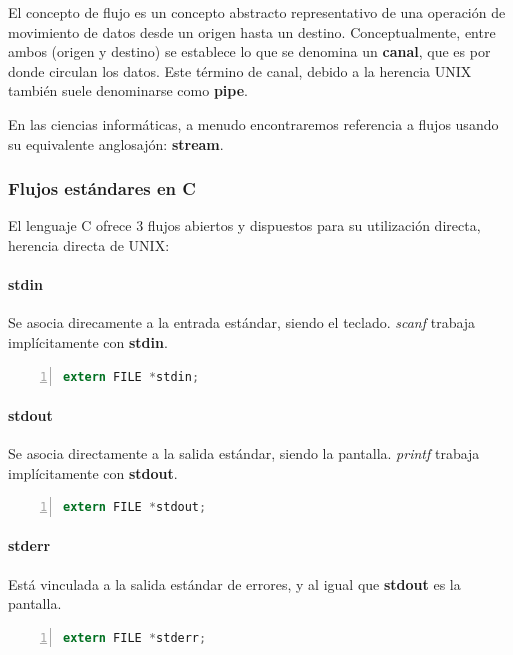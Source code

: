 \documentclass[a4paper, 11pt, titlepage]{article}
\begin{document}
        El concepto de flujo es un concepto abstracto representativo de una operación de movimiento 
        de datos desde un origen hasta un destino. Conceptualmente, entre ambos (origen y destino) se establece
        lo que se denomina un \textbf{canal}, que es por donde circulan los datos. Este término de canal, 
        debido a la herencia UNIX también suele denominarse como \textbf{pipe}.

        En las ciencias informáticas, a menudo encontraremos referencia a flujos usando su equivalente 
        anglosajón: \textbf{stream}.

        \subsubsection{Flujos estándares en C}

            El lenguaje C ofrece 3 flujos abiertos y dispuestos para su utilización directa, herencia 
            directa de UNIX:

            \paragraph{stdin} Se asocia direcamente a la entrada estándar, siendo el teclado.
            \textit{scanf} trabaja implícitamente con \textbf{stdin}.

            \begin{lstlisting}[language=C,numbers=left]
    extern FILE *stdin; \end{lstlisting}
            
            \paragraph{stdout} Se asocia directamente a la salida estándar, siendo la pantalla. 
            \textit{printf} trabaja implícitamente con \textbf{stdout}.

            \begin{lstlisting}[language=C,numbers=left]
    extern FILE *stdout; \end{lstlisting}
        

            \paragraph{stderr} Está vinculada a la salida estándar de errores, y al igual que 
            \textbf{stdout} es la pantalla. 

            \begin{lstlisting}[language=C,numbers=left]
    extern FILE *stderr; \end{lstlisting}
        
\end{document}
